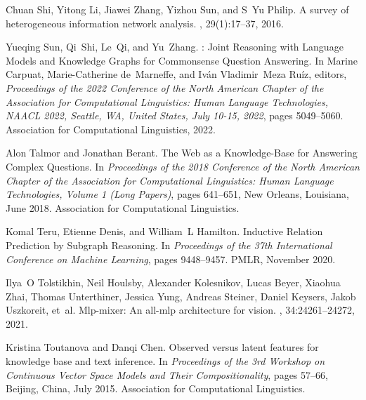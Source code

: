 \documentclass[11pt]{article}
\begin{document}
\begin{thebibliography}{10}
Chuan Shi, Yitong Li, Jiawei Zhang, Yizhou Sun, and S~Yu Philip.
\newblock A survey of heterogeneous information network analysis.
,
  29(1):17--37, 2016.

Yueqing Sun, Qi~Shi, Le~Qi, and Yu~Zhang.
: {{Joint Reasoning}} with {{Language Models}} and
  {{Knowledge Graphs}} for {{Commonsense Question Answering}}.
\newblock In Marine Carpuat, Marie-Catherine de~Marneffe, and Iv{\'a}n
  Vladimir~Meza Ru{\'i}z, editors, {\em Proceedings of the 2022 {{Conference}}
  of the {{North American Chapter}} of the {{Association}} for {{Computational
  Linguistics}}: {{Human Language Technologies}}, {{NAACL}} 2022, {{Seattle}},
  {{WA}}, {{United States}}, {{July}} 10-15, 2022}, pages 5049--5060.
  {Association for Computational Linguistics}, 2022.

Alon Talmor and Jonathan Berant.
\newblock The {{Web}} as a {{Knowledge-Base}} for {{Answering Complex
  Questions}}.
\newblock In {\em Proceedings of the 2018 {{Conference}} of the {{North
  American Chapter}} of the {{Association}} for {{Computational Linguistics}}:
  {{Human Language Technologies}}, {{Volume}} 1 ({{Long Papers}})}, pages
  641--651, {New Orleans, Louisiana}, June 2018. {Association for Computational
  Linguistics}.

Komal Teru, Etienne Denis, and William~L Hamilton.
\newblock Inductive {{Relation Prediction}} by {{Subgraph Reasoning}}.
\newblock In {\em Proceedings of the 37th {{International Conference}} on
  {{Machine Learning}}}, pages 9448--9457. {PMLR}, November 2020.

Ilya~O Tolstikhin, Neil Houlsby, Alexander Kolesnikov, Lucas Beyer, Xiaohua
  Zhai, Thomas Unterthiner, Jessica Yung, Andreas Steiner, Daniel Keysers,
  Jakob Uszkoreit, et~al.
\newblock Mlp-mixer: An all-mlp architecture for vision.
,
  34:24261--24272, 2021.

Kristina Toutanova and Danqi Chen.
\newblock Observed versus latent features for knowledge base and text
  inference.
\newblock In {\em Proceedings of the 3rd {{Workshop}} on {{Continuous Vector
  Space Models}} and Their {{Compositionality}}}, pages 57--66, {Beijing,
  China}, July 2015. {Association for Computational Linguistics}.


\end{thebibliography}
\end{document}
